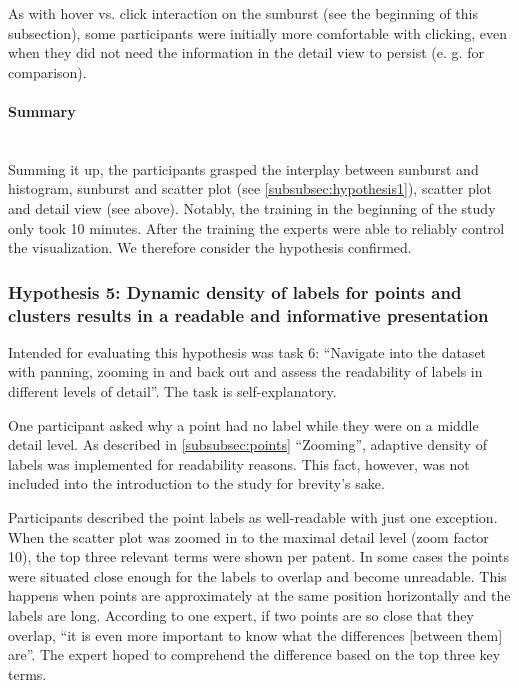 As with hover vs. click interaction on the sunburst (see the beginning of this subsection), some participants were initially more comfortable with clicking, even when they did not need the information in the detail view to persist (e. g. for comparison).

\paragraph{Summary}~\\
Summing it up, the participants grasped the interplay between sunburst and histogram, sunburst and scatter plot (see \autoref{subsubsec:hypothesis1}), scatter plot and detail view (see above).
Notably, the training in the beginning of the study only took 10 minutes.
After the training the experts were able to reliably control the visualization.
We therefore consider the hypothesis confirmed. 

\subsubsection{Hypothesis 5: Dynamic density of labels for points and clusters results in a readable and informative presentation}
\label{subsubsec:hypothesis5}

Intended for evaluating this hypothesis was task 6: ``Navigate into the dataset with panning, zooming in and back out and assess the readability of labels in different levels of detail''. 
The task is self-explanatory.

One participant asked why a point had no label while they were on a middle detail level.
As described in \autoref{subsubsec:points} ``Zooming'', adaptive density of labels was implemented for readability reasons.
This fact, however, was not included into the introduction to the study for brevity's sake.

Participants described the point labels as well-readable with just one exception.
When the scatter plot was zoomed in to the maximal detail level (zoom factor 10), the top three relevant terms were shown per patent.
In some cases the points were situated close enough for the labels to overlap and become unreadable.
This happens when points are approximately at the same position horizontally and the labels are long.
According to one expert, if two points are so close that they overlap, ``it is even more important to know what the differences [between them] are''.
The expert hoped to comprehend the difference based on the top three key terms.

